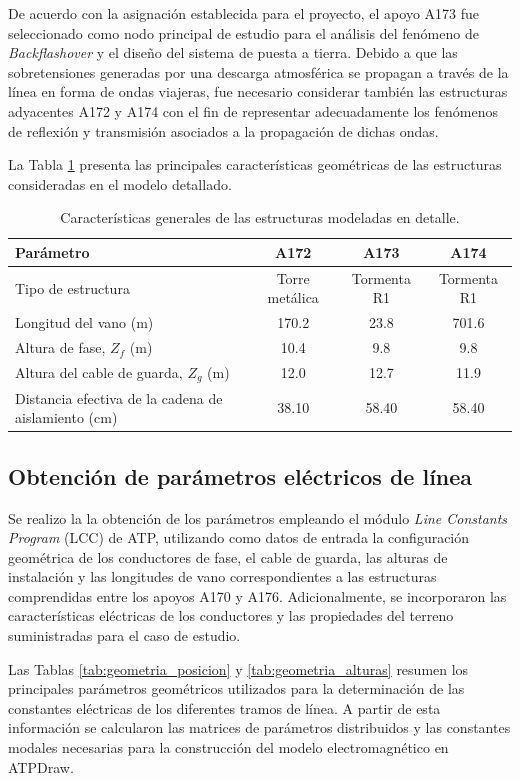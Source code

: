 \documentclass[12pt,letterpaper]{article}
\begin{document}
De acuerdo con la asignación establecida para el proyecto, el apoyo A173 fue seleccionado como nodo principal de estudio para el análisis del fenómeno de \textit{Backflashover} y el diseño del sistema de puesta a tierra. Debido a que las sobretensiones generadas por una descarga atmosférica se propagan a través de la línea en forma de ondas viajeras, fue necesario considerar también las estructuras adyacentes A172 y A174 con el fin de representar adecuadamente los fenómenos de reflexión y transmisión asociados a la propagación de dichas ondas.

La Tabla \ref{tab:nodos_estudio} presenta las principales características geométricas de las estructuras consideradas en el modelo detallado.

\begin{table}[H]
\centering
\caption{Características generales de las estructuras modeladas en detalle.}
\label{tab:nodos_estudio}
\renewcommand{\arraystretch}{1.2}
\begin{tabular}{lccc}
\toprule
Parámetro & A172 & A173 & A174 \\
\midrule
Tipo de estructura & Torre metálica & Tormenta R1 & Tormenta R1 \\
Longitud del vano (m) & 170.2 & 23.8 & 701.6 \\
Altura de fase, $Z_f$ (m) & 10.4 & 9.8 & 9.8 \\
Altura del cable de guarda, $Z_g$ (m) & 12.0 & 12.7 & 11.9 \\
Distancia efectiva de la cadena de aislamiento (cm) & 38.10 & 58.40 & 58.40 \\
\bottomrule
\end{tabular}
\end{table}

\subsection{Obtención de parámetros eléctricos de línea}

Se realizo la la obtención de los parámetros empleando el módulo \textit{Line Constants Program} (LCC) de ATP, utilizando como datos de entrada la configuración geométrica de los conductores de fase, el cable de guarda, las alturas de instalación y las longitudes de vano correspondientes a las estructuras comprendidas entre los apoyos A170 y A176. Adicionalmente, se incorporaron las características eléctricas de los conductores y las propiedades del terreno suministradas para el caso de estudio.

Las Tablas \ref{tab:geometria_posicion}  y \ref{tab:geometria_alturas} resumen los principales parámetros geométricos utilizados para la determinación de las constantes eléctricas de los diferentes tramos de línea. A partir de esta información se calcularon las matrices de parámetros distribuidos y las constantes modales necesarias para la construcción del modelo electromagnético en ATPDraw.
\end{document}
